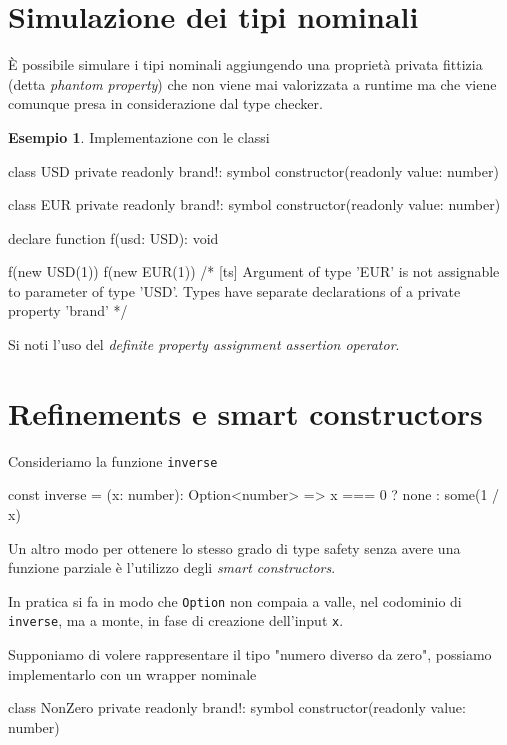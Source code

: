 \documentclass[12pt]{article}
\theoremstyle{definition}
\newtheorem{example}{Esempio}[subsection]
\newenvironment{code}
  {\vspace{0.5cm} \VerbatimEnvironment\begin{typescriptcode}}
  {\end{typescriptcode} \vspace{0.2cm}}
\begin{document}
\newpage
\section{Simulazione dei tipi nominali}

È possibile simulare i tipi nominali aggiungendo una proprietà privata fittizia (detta \emph{phantom property}) che non viene mai valorizzata
a runtime ma che viene comunque presa in considerazione dal type checker.

\begin{example}
Implementazione con le classi

\begin{code}
class USD {
  private readonly brand!: symbol
  constructor(readonly value: number) {}
}

class EUR {
  private readonly brand!: symbol
  constructor(readonly value: number) {}
}

declare function f(usd: USD): void

f(new USD(1))
f(new EUR(1))
/*
[ts]
Argument of type 'EUR' is not assignable to parameter
of type 'USD'. Types have separate declarations of a
private property 'brand'
*/
\end{code}
\end{example}

Si noti l'uso del \emph{definite property assignment assertion operator}.

\newpage
\section{Refinements e smart constructors}

Consideriamo la funzione \texttt{inverse}

\begin{code}
const inverse = (x: number): Option<number> =>
  x === 0 ? none : some(1 / x)
\end{code}

Un altro modo per ottenere lo stesso grado di type safety senza avere una funzione parziale è l'utilizzo degli \emph{smart constructors}.

In pratica si fa in modo che \texttt{Option} non compaia a valle, nel codominio di \texttt{inverse},
ma a monte, in fase di creazione dell'input \texttt{x}.

Supponiamo di volere rappresentare il tipo "numero diverso da zero", possiamo implementarlo con un wrapper nominale

\begin{code}
class NonZero {
  private readonly brand!: symbol
  constructor(readonly value: number) {}
}
\end{code}
\end{document}
